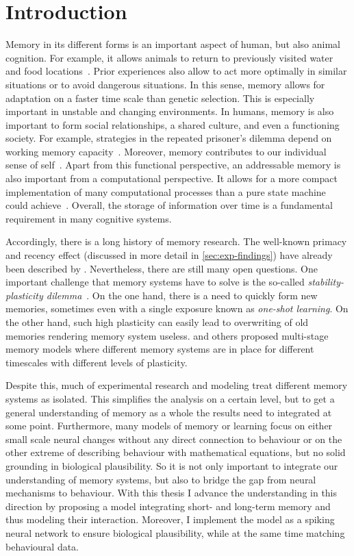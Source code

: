 \chapter{Introduction}

Memory in its different forms is an important aspect of human, but also animal cognition.
For example, it allows animals to return to previously visited water and food locations~\parencite{vorhees2014}.
Prior experiences also allow to act more optimally in similar situations or to avoid dangerous situations.
In this sense, memory allows for adaptation on a faster time scale than genetic selection.
This is especially important in unstable and changing environments.
In humans, memory is also important to form social relationships, a shared culture, and even a functioning society.
For example, strategies in the repeated prisoner's dilemma depend on working memory capacity~\parencite{milinski1998}.
Moreover, memory contributes to our individual sense of self~\parencite{prebble2013}.
Apart from this functional perspective, an addressable memory is also important from a computational perspective.
It allows for a more compact implementation of many computational processes than a pure state machine could achieve~\parencite{gallistel2009}.
Overall, the storage of information over time is a fundamental requirement in many cognitive systems.

Accordingly, there is a long history of memory research.
The well-known primacy and recency effect (discussed in more detail in \cref{sec:exp-findings}) have already been described by \textcite{Robinson1926}.
Nevertheless, there are still many open questions.
One important challenge that memory systems have to solve is the so-called \emph{stability-plasticity dilemma}~\parencite{Abraham2005}.
On the one hand, there is a need to quickly form new memories, sometimes even with a single exposure known as \emph{one-shot learning}.
On the other hand, such high plasticity can easily lead to overwriting of old memories rendering memory system useless.
\Textcite{Buzsaki1989} and others proposed multi-stage memory models where different memory systems are in place for different timescales with different levels of plasticity.

Despite this, much of experimental research and modeling treat different memory systems as isolated.
This simplifies the analysis on a certain level, but to get a general understanding of memory as a whole the results need to integrated at some point.
Furthermore, many models of memory or learning focus on either small scale neural changes without any direct connection to behaviour or on the other extreme of describing behaviour with mathematical equations, but no solid grounding in biological plausibility.
So it is not only important to integrate our understanding of memory systems, but also to bridge the gap from neural mechanisms to behaviour.
With this thesis I advance the understanding in this direction by proposing a model integrating short- and long-term memory and thus modeling their interaction.
Moreover, I implement the model as a spiking neural network to ensure biological plausibility, while at the same time matching behavioural data.

